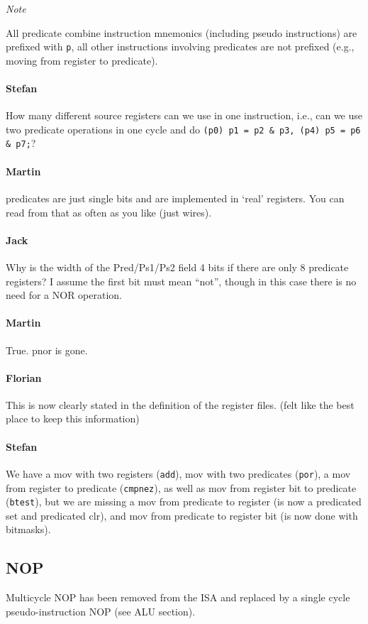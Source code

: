 \documentclass{IEEEtran}
\newcommand{\comment}[3]{\paragraph*{\textbf{#1}}{\color{#3}#2}}
\newcommand{\martin}[1]{\comment{Martin}{#1}{Blue}}
\newcommand{\stefan}[1]{\comment{Stefan}{#1}{RoyalPurple}}
\newcommand{\fb}[1]{\comment{Florian}{#1}{Emerald}}
\newcommand{\jack}[1]{\comment{Jack}{#1}{Magenta}}
\begin{document}
\emph{Note}

All predicate combine instruction mnemonics (including pseudo instructions) are prefixed with \texttt{p}, 
all other instructions involving predicates are not prefixed (e.g., moving from register to predicate).


\stefan{How many different source registers can we use in one instruction, i.e., can we use two predicate operations in one cycle and do
\texttt{(p0) p1 = p2 \& p3, (p4) p5 = p6 \& p7;}?
}
\martin{predicates are just single bits and are implemented in `real'
registers. You can read from that as often as you like (just wires).}
\jack{Why is the width of the Pred/Ps1/Ps2 field 4 bits if there are only
8 predicate registers? I assume the first bit must mean ``not'', though
in this case there is no need for a NOR operation.}
\martin{True. pnor is gone.}
\fb{This is now clearly stated in the definition of the register files. (felt
    like the best place to keep this information)}

\stefan{We have a mov with two registers (\texttt{add}), mov with two predicates (\texttt{por}), a mov from register to
predicate (\texttt{cmpnez}), as well as mov from register bit to predicate (\texttt{btest}), but we are missing a 
mov from predicate to register (is now a predicated set and predicated clr), and mov from predicate to register bit (is now done with
bitmasks).}


\vspace{5mm}
\subsection{NOP} 
Multicycle NOP has been removed from the ISA and replaced by a single cycle pseudo-instruction NOP (see ALU section). 
\end{document}
